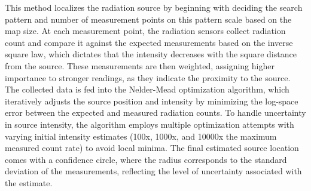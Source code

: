 \documentclass[../report.tex]{subfiles}
\begin{document}

    This method localizes the radiation source by beginning with deciding the search pattern and number of measurement points on this pattern scale based on the map size. At each
    measurement point, the radiation sensors collect radiation count and compare it against the expected measurements based on the inverse square law, which dictates that the intensity 
    decreases with the square distance from the source. These measurements are then weighted, assigning higher importance to stronger readings, as they indicate the proximity 
    to the source. The collected data is fed into the Nelder-Mead optimization algorithm, which iteratively adjusts the source position and intensity by minimizing the log-space error
    between the expected and measured radiation counts. To handle uncertainty in source intensity, the algorithm employs multiple optimization attempts with varying initial intensity estimates 
    (100x, 1000x, and 10000x the maximum measured count rate) to avoid local minima. The final estimated source location comes with a confidence circle, where the radius corresponds to the standard deviation of the measurements,
     reflecting the level of uncertainty associated with the estimate.
\end{document}
